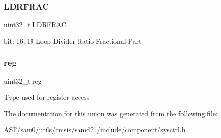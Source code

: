 \subsubsection{\texorpdfstring{LDRFRAC}{LDRFRAC}}
{\footnotesize\ttfamily uint32\+\_\+t L\+D\+R\+F\+R\+AC}

bit\+: 16..19 Loop Divider Ratio Fractional Part \mbox{\label{union_s_y_s_c_t_r_l___d_p_l_l_r_a_t_i_o___type_a6b91636401516a477989a336376d7b40}} 
\subsubsection{\texorpdfstring{reg}{reg}}
{\footnotesize\ttfamily uint32\+\_\+t reg}

Type used for register access 

The documentation for this union was generated from the following file\+:\begin{DoxyCompactItemize}
\item 
A\+S\+F/sam0/utils/cmsis/samd21/include/component/\mbox{\hyperlink{component_2sysctrl_8h}{sysctrl.\+h}}\end{DoxyCompactItemize}
